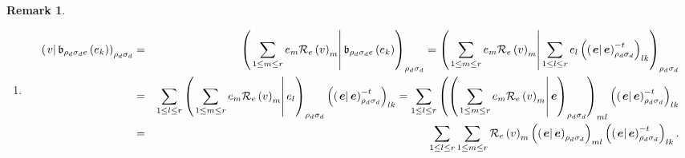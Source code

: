 \documentclass[aps,preprint]{revtex4}
\newtheorem{remark}[theorem]{Remark}
\begin{document}
\begin{remark}
\begin{enumerate}
\item 
\begin{eqnarray}
\left( \left. v\right\vert \mathfrak{b}_{\rho _{d}\sigma _{d}e}\left(
e_{k}\right) \right) _{\rho _{d}\sigma _{d}} &=&\left( \left. \sum_{1\leq
m\leq r}e_{m}\mathcal{R}_{e}\left( v\right) _{m}\right\vert \mathfrak{b}%
_{\rho _{d}\sigma _{d}e}\left( e_{k}\right) \right) _{\rho _{d}\sigma
_{d}}=\left( \left. \sum_{1\leq m\leq r}e_{m}\mathcal{R}_{e}\left( v\right)
_{m}\right\vert \sum_{1\leq l\leq r}e_{l}\left( \overset{}{\left( \left. 
\boldsymbol{e}\right\vert \boldsymbol{e}\right) _{\rho _{d}\sigma _{d}}^{-t}}%
\right) _{lk}\right) _{\rho _{d}\sigma _{d}} \\
&=&\sum_{1\leq l\leq r}\left( \left. \sum_{1\leq m\leq r}e_{m}\mathcal{R}%
_{e}\left( v\right) _{m}\right\vert e_{l}\right) _{\rho _{d}\sigma
_{d}}\left( \overset{}{\left( \left. \boldsymbol{e}\right\vert \boldsymbol{e}%
\right) _{\rho _{d}\sigma _{d}}^{-t}}\right) _{lk}=\sum_{1\leq l\leq
r}\left( \left( \left. \sum_{1\leq m\leq r}e_{m}\mathcal{R}_{e}\left(
v\right) _{m}\right\vert \boldsymbol{e}\right) _{\rho _{d}\sigma
_{d}}\right) _{ml}\left( \left( \left. \boldsymbol{e}\right\vert \boldsymbol{%
e}\right) _{\rho _{d}\sigma _{d}}^{-t}\right) _{lk} \\
&=&\sum_{1\leq l\leq r}\sum_{1\leq m\leq r}\mathcal{R}_{e}\left( v\right)
_{m}\left( \left( \left. \boldsymbol{e}\right\vert \boldsymbol{e}\right)
_{\rho _{d}\sigma _{d}}\right) _{ml}\left( \left( \left. \boldsymbol{e}%
\right\vert \boldsymbol{e}\right) _{\rho _{d}\sigma _{d}}^{-t}\right) _{lk}.
\end{eqnarray}


\end{enumerate}
\end{remark}
\end{document}
